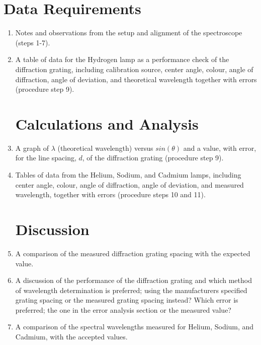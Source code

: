 \section{{\bf Data Requirements}}
\begin{enumerate}[resume]

\item Notes and observations from the setup and alignment of the spectroscope (steps 1-7). 

\item A table of data for the Hydrogen lamp as a performance check of the diffraction grating, including calibration source, center angle, colour, angle of diffraction, angle of deviation, and theoretical wavelength together with errors (procedure step 9).


\section{Calculations and Analysis}

\item A graph of $\lambda$ (theoretical wavelength) versus $sin(\theta)$ and a value, with error, for the line spacing, $d$, of the diffraction grating (procedure step 9).

\item Tables of data from the Helium, Sodium, and Cadmium lamps, including center angle, colour, angle of diffraction, angle of deviation, and measured wavelength, together with errors (procedure steps 10 and 11).

\section{Discussion}

\item A comparison of the measured diffraction grating spacing with the expected value.

\item A discussion of the performance of the diffraction grating and which method of wavelength determination is preferred; using the manufacturers specified grating spacing or the measured grating spacing instead? Which error is preferred; the one in the error analysis section or the measured value?

\item A comparison of the spectral wavelengths measured for Helium, Sodium, and Cadmium, with the accepted values.

\end{enumerate}

